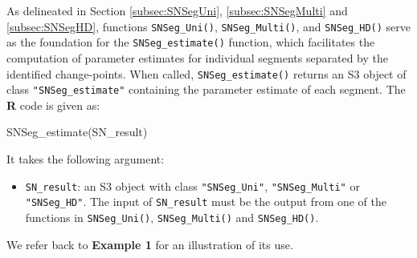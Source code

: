 
{As delineated in Section \ref{subsec:SNSegUni}, \ref{subsec:SNSegMulti} and \ref{subsec:SNSegHD}, functions \texttt{SNSeg\_Uni()}, \texttt{SNSeg\_Multi()}, and \texttt{SNSeg\_HD()}  serve as the foundation for the \texttt{SNSeg\_estimate()} function, which facilitates the computation of parameter estimates for individual segments separated by the identified change-points. When called, \texttt{SNSeg\_estimate()} returns an S3 object of class \texttt{"SNSeg\_estimate"} containing the parameter estimate of each segment.  The \textbf{R} code is given as:}
\begin{example}
    SNSeg_estimate(SN_result)
\end{example}
{It takes the following argument:\begin{itemize}
    \item \texttt{SN\_result}: an S3 object with class \texttt{"SNSeg\_Uni"}, \texttt{"SNSeg\_Multi"} or \texttt{"SNSeg\_HD"}. The input of \texttt{SN\_result} must be the output from one of the functions in \texttt{SNSeg\_Uni()}, \texttt{SNSeg\_Multi()} and \texttt{SNSeg\_HD()}.
\end{itemize}
We refer back to \textbf{Example 1} for an illustration of its use.
}



